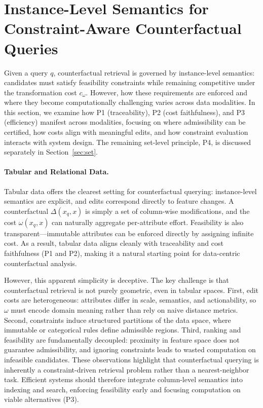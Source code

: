 \section{Instance-Level Semantics for Constraint-Aware Counterfactual Queries}

% 
\label{sec:instance}

Given a query $q$, counterfactual retrieval is governed by instance-level semantics: candidates must satisfy feasibility constraints while remaining competitive under the transformation cost $c_\omega$. However, how these requirements are enforced and where they become computationally challenging varies across data modalities. In this section, we examine how P1 (traceability), P2 (cost faithfulness), and P3 (efficiency) manifest across modalities, focusing on where admissibility can be certified, how costs align with meaningful edits, and how constraint evaluation interacts with system design. The remaining set-level principle, P4, is discussed separately in Section~\ref{sec:set}.

\paragraph{Tabular and Relational Data.}
Tabular data offers the clearest setting for counterfactual querying: instance-level semantics are explicit, and edits correspond directly to feature changes. A counterfactual $\Delta(x_q,x)$ is simply a set of column-wise modifications, and the cost $\omega(x_q,x)$ can naturally aggregate per-attribute effort. Feasibility is also transparent—immutable attributes can be enforced directly by assigning infinite cost. As a result, tabular data aligns cleanly with traceability and cost faithfulness (P1 and P2), making it a natural starting point for data-centric counterfactual analysis.

However, this apparent simplicity is deceptive. The key challenge is that counterfactual retrieval is not purely geometric, even in tabular spaces. First, edit costs are heterogeneous: attributes differ in scale, semantics, and actionability, so $\omega$ must encode domain meaning rather than rely on naive distance metrics. Second, constraints induce structured partitions of the data space, where immutable or categorical rules define admissible regions. Third, ranking and feasibility are fundamentally decoupled: proximity in feature space does not guarantee admissibility, and ignoring constraints leads to wasted computation on infeasible candidates. These observations highlight that counterfactual querying is inherently a constraint-driven retrieval problem rather than a nearest-neighbor task. Efficient systems should therefore integrate column-level semantics into indexing and search, enforcing feasibility early and focusing computation on viable alternatives (P3).


